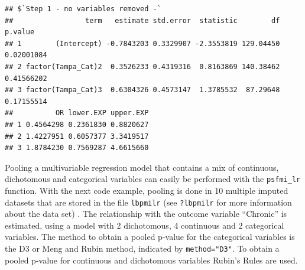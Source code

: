 \documentclass[
]{book}
\newenvironment{Shaded}{\begin{snugshade}}{\end{snugshade}}
\newcommand{\AttributeTok}[1]{\textcolor[rgb]{0.77,0.63,0.00}{#1}}
\newcommand{\DecValTok}[1]{\textcolor[rgb]{0.00,0.00,0.81}{#1}}
\newcommand{\FunctionTok}[1]{\textcolor[rgb]{0.00,0.00,0.00}{#1}}
\newcommand{\NormalTok}[1]{#1}
\newcommand{\OtherTok}[1]{\textcolor[rgb]{0.56,0.35,0.01}{#1}}
\newcommand{\SpecialCharTok}[1]{\textcolor[rgb]{0.00,0.00,0.00}{#1}}
\newcommand{\StringTok}[1]{\textcolor[rgb]{0.31,0.60,0.02}{#1}}
\begin{document}
\begin{verbatim}
## $`Step 1 - no variables removed -`
##                 term   estimate std.error  statistic        df    p.value
## 1        (Intercept) -0.7843203 0.3329907 -2.3553819 129.04450 0.02001084
## 2 factor(Tampa_Cat)2  0.3526233 0.4319316  0.8163869 140.38462 0.41566202
## 3 factor(Tampa_Cat)3  0.6304326 0.4573147  1.3785532  87.29648 0.17155514
##          OR lower.EXP upper.EXP
## 1 0.4564298 0.2361830 0.8820627
## 2 1.4227951 0.6057377 3.3419517
## 3 1.8784230 0.7569287 4.6615660
\end{verbatim}

Pooling a multivariable regression model that contains a mix of continuous, dichotomous and categorical variables can easily be performed with the \texttt{psfmi\_lr} function. With the next code example, pooling is done in 10 multiple imputed datasets that are stored in the file \texttt{lbpmilr} (see \texttt{?lbpmilr} for more information about the data set) . The relationship with the outcome variable ``Chronic'' is estimated, using a model with 2 dichotomous, 4 continuous and 2 categorical variables. The method to obtain a pooled p-value for the categorical variables is the D3 or Meng and Rubin method, indicated by \texttt{method="D3"}. To obtain a pooled p-value for continuous and dichotomous variables Rubin's Rules are used.

\begin{Shaded}
\end{Shaded}
\end{document}
